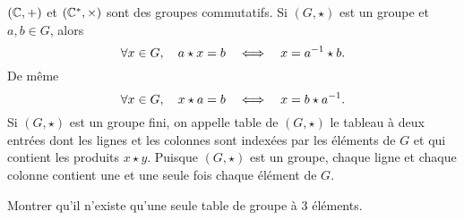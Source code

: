 \documentclass{magnolia}
\begin{document}
\begin{remarques}
\remarque $(\mathbb{C},+)$ et $(\mathbb{C}^*,\times)$ sont des groupes commutatifs.
\remarque Si $(G,\star)$ est un groupe et $a, b\in G$, alors
  \[\forall x\in G,\quad a\star x = b \quad\Longleftrightarrow\quad x=a^{-1}\star b.\]
  De même
  \[\forall x\in G,\quad x \star a = b \quad\Longleftrightarrow\quad x=b\star a^{-1}.\]
\remarque Si $(G,\star)$ est un groupe fini, on appelle table de $(G,\star)$ le
  tableau à deux entrées dont les lignes et les colonnes sont 
  indexées par les éléments de $G$ et qui contient les produits $x\star y$.
  Puisque $(G,\star)$ est un groupe, chaque
  ligne et chaque colonne contient une et une seule fois chaque élément de
  $G$.
\end{remarques}

\begin{exoUnique}
\exo Montrer qu'il n'existe qu'une seule table de groupe à 3 éléments.
\end{exoUnique}

\end{document}
